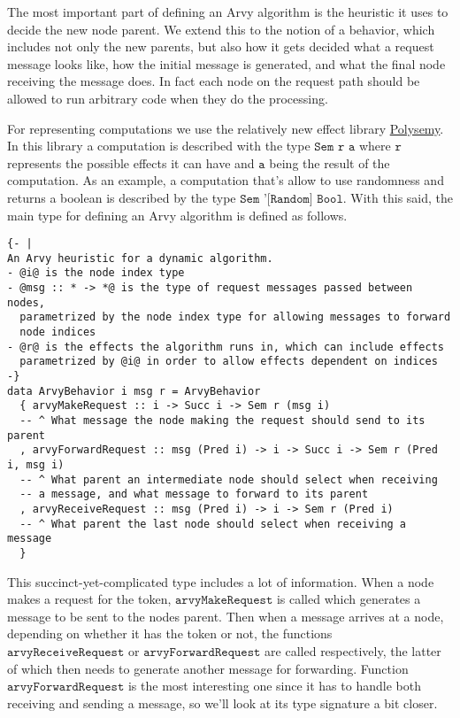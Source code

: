 \documentclass[a4paper, oneside]{discothesis}
\begin{document}
The most important part of defining an Arvy algorithm is the heuristic it uses to decide the new node parent. We extend this to the notion of a behavior, which includes not only the new parents, but also how it gets decided what a request message looks like, how the initial message is generated, and what the final node receiving the message does. In fact each node on the request path should be allowed to run arbitrary code when they do the processing.

For representing computations we use the relatively new effect library \href{https://hackage.haskell.org/package/polysemy}{Polysemy}. In this library a computation is described with the type $\texttt{Sem r a}$ where $\texttt{r}$ represents the possible effects it can have and $\texttt{a}$ being the result of the computation. As an example, a computation that's allow to use randomness and returns a boolean is described by the type $\texttt{Sem '[Random] Bool}$. With this said, the main type for defining an Arvy algorithm is defined as follows.

\begin{verbatim}
{- |
An Arvy heuristic for a dynamic algorithm.
- @i@ is the node index type
- @msg :: * -> *@ is the type of request messages passed between nodes,
  parametrized by the node index type for allowing messages to forward
  node indices
- @r@ is the effects the algorithm runs in, which can include effects
  parametrized by @i@ in order to allow effects dependent on indices
-}
data ArvyBehavior i msg r = ArvyBehavior
  { arvyMakeRequest :: i -> Succ i -> Sem r (msg i)
  -- ^ What message the node making the request should send to its parent
  , arvyForwardRequest :: msg (Pred i) -> i -> Succ i -> Sem r (Pred i, msg i)
  -- ^ What parent an intermediate node should select when receiving
  -- a message, and what message to forward to its parent
  , arvyReceiveRequest :: msg (Pred i) -> i -> Sem r (Pred i)
  -- ^ What parent the last node should select when receiving a message
  }
\end{verbatim}

This succinct-yet-complicated type includes a lot of information. When a node makes a request for the token, $\texttt{arvyMakeRequest}$ is called which generates a message to be sent to the nodes parent. Then when a message arrives at a node, depending on whether it has the token or not, the functions $\texttt{arvyReceiveRequest}$ or $\texttt{arvyForwardRequest}$ are called respectively, the latter of which then needs to generate another message for forwarding. Function $\texttt{arvyForwardRequest}$ is the most interesting one since it has to handle both receiving and sending a message, so we'll look at its type signature a bit closer.
\end{document}
